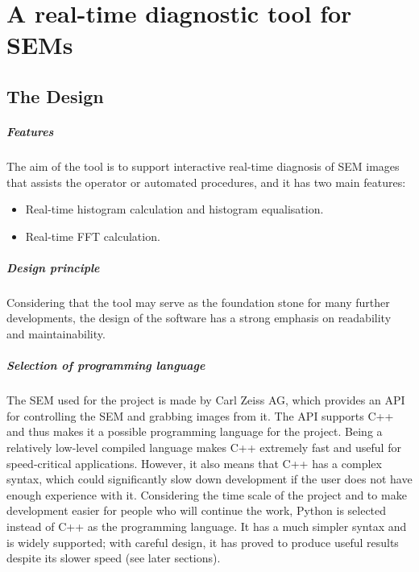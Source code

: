 \documentclass[12pt, twocolumn]{report}
\begin{document}
\chapter{A real-time diagnostic tool for SEMs}
\section{The Design}
\paragraph{Features}
The aim of the tool is to support interactive real-time diagnosis of SEM images that assists the operator or automated procedures, and it has two main features:
\begin{itemize}
    \item Real-time histogram calculation and histogram equalisation.
    \item Real-time FFT calculation.
\end{itemize}

\paragraph{Design principle}
Considering that the tool may serve as the foundation stone for many further developments, the design of the software has a strong emphasis on readability and maintainability.

\paragraph{Selection of programming language}
The SEM used for the project is made by Carl Zeiss AG, which provides an API for controlling the SEM and grabbing images from it. The API supports C++ and thus makes it a possible programming language for the project. Being a relatively low-level compiled language makes C++ extremely fast and useful for speed-critical applications. However, it also means that C++ has a complex syntax, which could significantly slow down development if the user does not have enough experience with it. Considering the time scale of the project and to make development easier for people who will continue the work, Python is selected instead of C++ as the programming language. It has a much simpler syntax and is widely supported; with careful design, it has proved to produce useful results despite its slower speed (see later sections).
\end{document}
